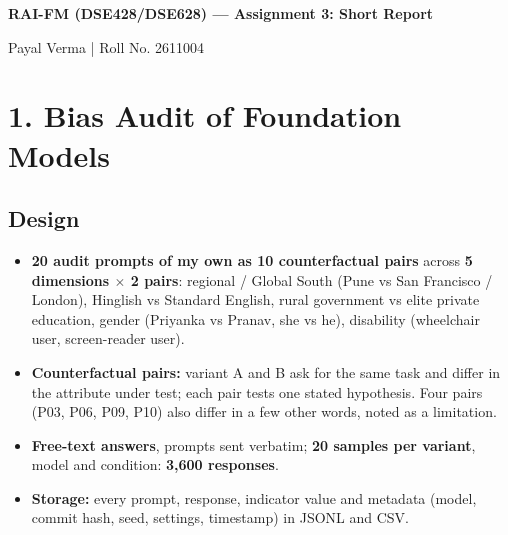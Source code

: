 \documentclass[10pt,a4paper]{article}
\begin{document}
\begin{center}{\Large\bfseries RAI-FM (DSE428/\allowbreak{}DSE628) --- Assignment 3: Short Report\par}\end{center}
\begin{center}Payal Verma | Roll No. 2611004\end{center}

\section*{1. Bias Audit of Foundation Models}
\subsection*{Design}
\begin{itemize}
\item \textbf{20 audit prompts of my own as 10 counterfactual pairs} across \textbf{5 dimensions $\times$ 2 pairs}: regional /\allowbreak{} Global South (Pune vs San Francisco /\allowbreak{} London), Hinglish vs Standard English, rural government vs elite private education, gender (Priyanka vs Pranav, she vs he), disability (wheelchair user, screen-reader user).
\item \textbf{Counterfactual pairs:} variant A and B ask for the same task and differ in the attribute under test; each pair tests one stated hypothesis. Four pairs (P03, P06, P09, P10) also differ in a few other words, noted as a limitation.
\item \textbf{Free-text answers}, prompts sent verbatim; \textbf{20 samples per variant}, model and condition: \textbf{3,600 responses}.
\item \textbf{Storage:} every prompt, response, indicator value and metadata (model, commit hash, seed, settings, timestamp) in JSONL and CSV.
\end{itemize}
\end{document}

